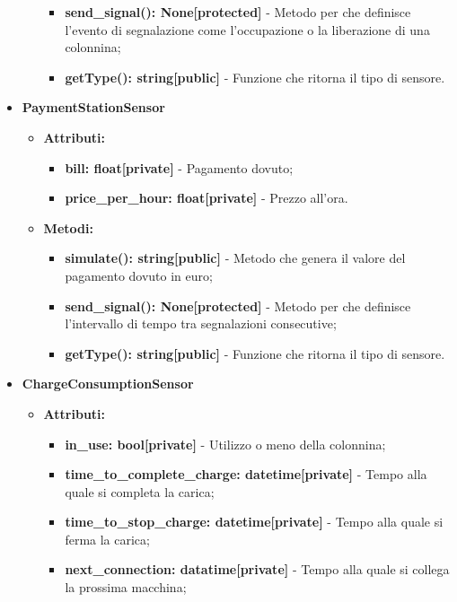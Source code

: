 \documentclass[8pt]{article}
\begin{document}
\begin{itemize}
\begin{itemize}
\begin{itemize}
            \item \textbf{send\_signal(): None[protected]} - Metodo per che definisce l'evento di segnalazione come l'occupazione o la liberazione di una colonnina;
            \item \textbf{getType(): string[public]} - Funzione che ritorna il tipo di sensore.
        \end{itemize}
    \end{itemize}
    \item \textbf{PaymentStationSensor}
    \begin{itemize}
        \item \textbf{Attributi:}
        \begin{itemize}
            \item \textbf{bill: float[private]} - Pagamento dovuto;
            \item \textbf{price\_per\_hour: float[private]} - Prezzo all'ora.
        \end{itemize}
        \item \textbf{Metodi:}
        \begin{itemize}
            \item \textbf{simulate(): string[public]} - Metodo che genera il valore del pagamento dovuto in euro;
            \item \textbf{send\_signal(): None[protected]} - Metodo per che definisce l'intervallo di tempo tra segnalazioni consecutive;
            \item \textbf{getType(): string[public]} - Funzione che ritorna il tipo di sensore.
        \end{itemize}
    \end{itemize}
    \item \textbf{ChargeConsumptionSensor}
    \begin{itemize}
        \item \textbf{Attributi:}
        \begin{itemize}
            \item \textbf{in\_use: bool[private]} - Utilizzo o meno della colonnina;
            \item \textbf{time\_to\_complete\_charge: datetime[private]} - Tempo alla quale si completa la carica;
            \item \textbf{time\_to\_stop\_charge: datetime[private]} - Tempo alla quale si ferma la carica;
            \item \textbf{next\_connection: datatime[private]} - Tempo alla quale si collega la prossima macchina;

\end{itemize}
\end{itemize}
\end{itemize}
\end{document}
